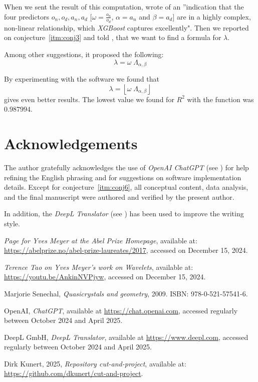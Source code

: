\documentclass[11pt]{article}
\theoremstyle{remark}
\begin{document}
When we sent the result of this computation, \chat wrote of an ”indication that the four predictors \(o_n, o_d, a_n, a_d\) [$\omega = \frac{o_n}{o_d}$, $\alpha = a_n$ and $\beta = a_d$] are in a highly complex, non-linear relationship, which \emph{XGBoost} captures excellently". Then we reported on conjecture~\ref{itm:conj3} and told \chat, that we want to find a formula for $\lambda$.

Among other suggestions, it proposed the following:
%
\begin{equation}
\lambda = \omega \; \Lambda_{\alpha, \beta}
\end{equation}

By experimenting with the \langc software we found that
%
\begin{equation}
\lambda = \left\lfloor \omega \; \Lambda_{\alpha, \beta} \right\rfloor
\end{equation}
%
gives even better results. The lowest value we found for $R^2$ with the \langc function  was $0.987994$.

\section*{Acknowledgements}

The author gratefully acknowledges the use of \emph{OpenAI ChatGPT} (see \cite{ChatGPT}) for help refining the English phrasing and for suggestions on software implementation details. Except for conjecture~\ref{itm:conj6}, all conceptual content, data analysis, and the final manuscript were authored and verified by the present author.

In addition, the \emph{DeepL Translator} (see \cite{DeepL}) has been used to improve the writing style.

\begin{thebibliography}{99}

\emph{Page for Yves Meyer at the Abel Prize Homepage},
available at: \url{https://abelprize.no/abel-prize-laureates/2017}, accessed on December 15, 2024.

\emph{Terence Tao on Yves Meyer's work on Wavelets},
available at: \url{https://youtu.be/AnkinNVPjyw}, accessed on December 15, 2024.

Marjorie Senechal,
\emph{Quasicrystals and geometry},
2009.
ISBN: 978-0-521-57541-6.

OpenAI, \emph{ChatGPT}, available at \url{https://chat.openai.com}, accessed regularly between October 2024 and April 2025.

DeepL GmbH, \emph{DeepL Translator}, available at \url{https://www.deepl.com}, accessed regularly between October 2024 and April 2025.

Dirk Kunert, 2025,
\emph{Repository \emph{cut-and-project}},
available at: \url{https://github.com/dkunert/cut-and-project}.

\end{thebibliography}
\end{document}
